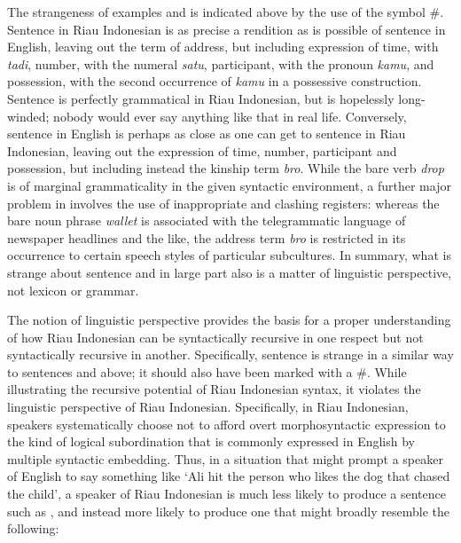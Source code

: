 \documentclass[output=paper]{langscibook}
\begin{document}
The strangeness of examples  and  is indicated above by the use of the symbol \#.  Sentence  in Riau Indonesian is as precise a rendition as is possible of sentence  in English, leaving out the term of address, but including expression of time, with \textit{tadi}, number, with the numeral \textit{satu}, participant, with the pronoun \textit{kamu}, and possession, with the second occurrence of \textit{kamu} in a possessive construction.  Sentence  is perfectly grammatical in Riau Indonesian, but is hopelessly long-winded; nobody would ever say anything like that in real life.  Conversely, sentence  in English is perhaps as close as one can get to sentence  in Riau Indonesian, leaving out the expression of time, number, participant and possession, but including instead the kinship term \textit{bro}.  While the bare verb \textit{drop} is of marginal grammaticality in the given syntactic environment, a further major problem in  involves the use of inappropriate and clashing registers: whereas the bare noun phrase \textit{wallet} is associated with the telegrammatic language of newspaper headlines and the like, the address term \textit{bro} is restricted in its occurrence to certain speech styles of particular subcultures.  In summary, what is strange about sentence  and in large part also  is a matter of linguistic perspective, not lexicon or grammar.

The notion of linguistic perspective provides the basis for a proper understanding of how Riau Indonesian can be syntactically recursive in one respect but not syntactically recursive in another.  Specifically, sentence  is strange in a similar way to sentences  and  above; it should also have been marked with a \#.  While illustrating the recursive potential of Riau Indonesian syntax, it violates the linguistic perspective of Riau Indonesian.  Specifically, in Riau Indonesian, speakers systematically choose not to afford overt morphosyntactic expression to the kind of logical subordination that is commonly expressed in English by multiple syntactic embedding.  Thus, in a situation that might prompt a speaker of English to say something like `Ali hit the person who likes the dog that chased the child', a speaker of Riau Indonesian is much less likely to produce a sentence such as , and instead more likely to produce one that might broadly resemble the following:
\end{document}
